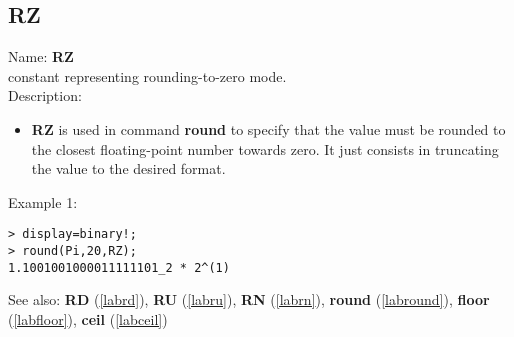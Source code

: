 \subsection{RZ}
\label{labrz}
\noindent Name: \textbf{RZ}\\
constant representing rounding-to-zero mode.\\
\noindent Description: \begin{itemize}

\item \textbf{RZ} is used in command \textbf{round} to specify that the value must be rounded
   to the closest floating-point number towards zero. It just consists in 
   truncating the value to the desired format.
\end{itemize}
\noindent Example 1: 
\begin{center}\begin{minipage}{15cm}\begin{Verbatim}[frame=single]
> display=binary!;
> round(Pi,20,RZ);
1.1001001000011111101_2 * 2^(1)
\end{Verbatim}
\end{minipage}\end{center}
See also: \textbf{RD} (\ref{labrd}), \textbf{RU} (\ref{labru}), \textbf{RN} (\ref{labrn}), \textbf{round} (\ref{labround}), \textbf{floor} (\ref{labfloor}), \textbf{ceil} (\ref{labceil})
